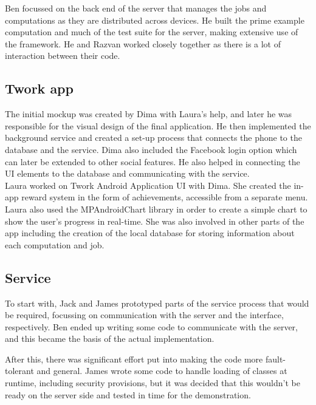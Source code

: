 \documentclass[a4paper,10pt]{article}
\begin{document}
Ben focussed on the back end of the server that manages the jobs and computations as they are distributed across devices.
He built the prime example computation and much of the test suite for the server, making extensive use of the framework.
He and Razvan worked closely together as there is a lot of interaction between their code.


\subsection{Twork app}
The initial mockup was created by Dima with Laura's help, and later he was responsible for the visual design of the final application. He then implemented the background service and created a set-up process that connects the phone to the database and the service. Dima also included the Facebook login option which can later be extended to other social features. He also helped in connecting the UI elements to the database and communicating with the service.\\

Laura worked on Twork Android Application UI with Dima. She created the in-app reward system in the form of achievements, accessible from a separate menu.
Laura also used the MPAndroidChart library in order to create a simple chart to show the user's progress in real-time.
She was also involved in other parts of the app including the creation of the local database for storing information about each computation and job.

\subsection{Service}

To start with, Jack and James prototyped parts of the service process that would be required, focussing on communication with the server and the interface, respectively. Ben ended up writing some code to communicate with the server, and this became the basis of the actual implementation.

After this, there was significant effort put into making the code more fault-tolerant and general. James wrote some code to handle loading of classes at runtime, including security provisions, but it was decided that this wouldn't be ready on the server side and tested in time for the demonstration.

\end{document}
